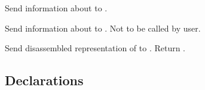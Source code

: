 \begin{LIST}{1cm}
  {
  Send information about  to .
  }

  {
  Send information about  to . Not to be
  called by user.
  }

  {
  Send disassembled representation of  to
  . Return \retval{\NIL}.
  }

\end{LIST}


\subsection{Declarations}
